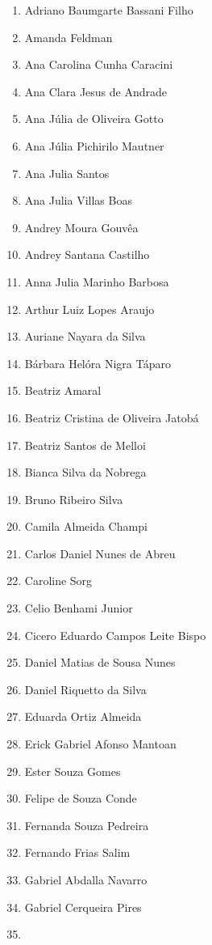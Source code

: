 \documentclass[
  letterpaper,
  DIV=11,
  numbers=noendperiod]{scrreprt}
\providecommand{\tightlist}{%
  \setlength{\itemsep}{0pt}\setlength{\parskip}{0pt}}\usepackage{longtable,booktabs,array}
\begin{document}
\begin{enumerate}
\def\labelenumi{\arabic{enumi}.}
\tightlist
\item
  Adriano Baumgarte Bassani Filho
\item
  Amanda Feldman
\item
  Ana Carolina Cunha Caracini
\item
  Ana Clara Jesus de Andrade
\item
  Ana Júlia de Oliveira Gotto
\item
  Ana Júlia Pichirilo Mautner
\item
  Ana Julia Santos
\item
  Ana Julia Villas Boas
\item
  Andrey Moura Gouvêa
\item
  Andrey Santana Castilho
\item
  Anna Julia Marinho Barbosa
\item
  Arthur Luiz Lopes Araujo
\item
  Auriane Nayara da Silva
\item
  Bárbara Helóra Nigra Táparo
\item
  Beatriz Amaral
\item
  Beatriz Cristina de Oliveira Jatobá
\item
  Beatriz Santos de Melloi
\item
  Bianca Silva da Nobrega
\item
  Bruno Ribeiro Silva
\item
  Camila Almeida Champi
\item
  Carlos Daniel Nunes de Abreu
\item
  Caroline Sorg
\item
  Celio Benhami Junior
\item
  Cicero Eduardo Campos Leite Bispo
\item
  Daniel Matias de Sousa Nunes
\item
  Daniel Riquetto da Silva
\item
  Eduarda Ortiz Almeida
\item
  Erick Gabriel Afonso Mantoan
\item
  Ester Souza Gomes
\item
  Felipe de Souza Conde
\item
  Fernanda Souza Pedreira
\item
  Fernando Frias Salim
\item
  Gabriel Abdalla Navarro
\item
  Gabriel Cerqueira Pires
\item

\end{enumerate}
\end{document}

